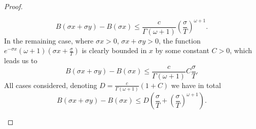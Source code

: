 \begin{proof}
\begin{enumerate}
    \begin{equation*}
        B(\sigma x + \sigma y) - B(\sigma x) 
        \leq \frac{c}{\Gamma(\omega + 1)} \left( \frac{\sigma}{T} \right)^{\omega + 1}.
    \end{equation*}
    In the remaining case, where $\sigma x > 0$, $\sigma x + \sigma y > 0$, the function $e^{-\sigma x} (\omega + 1) \left( \sigma x + \frac{\sigma}{T} \right)$ is clearly bounded in $x$ by some constant $C > 0$, which leads us to
    \begin{equation*}
        B(\sigma x + \sigma y) - B(\sigma x)
        \leq \frac{c}{\Gamma(\omega + 1)} C \frac{\sigma}{T}.
    \end{equation*}
    All cases considered, denoting $D = \frac{c}{\Gamma(\omega + 1)} (1 + C)$ we have in total
    \begin{equation}
    \label{eq:boundforB}
        B(\sigma x + \sigma y) - B(\sigma x) \leq D \left( \frac{\sigma}{T} +  \left( \frac{\sigma}{T} \right)^{\omega + 1} \right).
    \end{equation}
    

\end{enumerate}
\end{proof}
